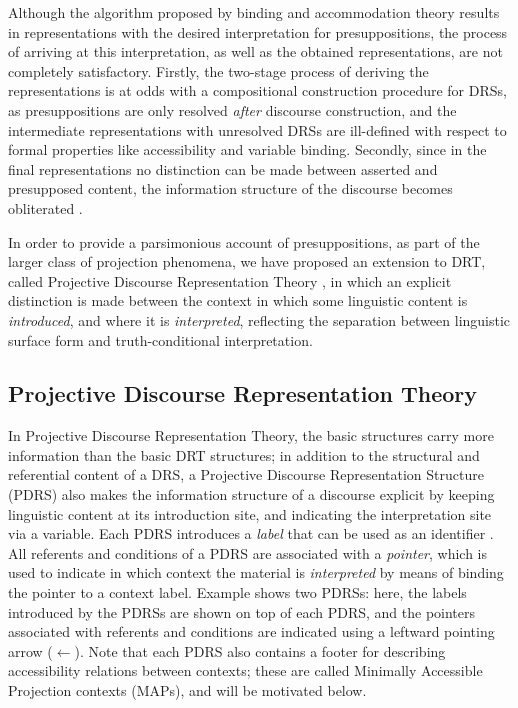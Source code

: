 \noindent Although the algorithm proposed by binding and accommodation
theory results in representations with the desired interpretation for
presuppositions, the process of arriving at this interpretation, as well as
the obtained representations, are not completely satisfactory. Firstly, the
two-stage process of deriving the representations is at odds with
a compositional construction procedure for DRSs, as presuppositions are only
resolved \textit{after} discourse construction, and the intermediate
representations with unresolved DRSs are ill-defined with respect to formal
properties like accessibility and variable binding. Secondly, since in the
final representations no distinction can be made between asserted and
presupposed content, the information structure of the discourse becomes
obliterated .


In order to provide a parsimonious account of presuppositions, as part of
the larger class of projection phenomena, we have proposed an extension to
DRT, called Projective Discourse Representation Theory
, in which an explicit distinction is
made between the context in which some linguistic content is
\textit{introduced}, and where it is \textit{interpreted}, reflecting the
separation between linguistic surface form and truth-conditional
interpretation.

\subsection{Projective Discourse Representation Theory}

In Projective Discourse Representation Theory, the basic structures carry
more information than the basic DRT structures; in addition to the
structural and referential content of a DRS, a Projective Discourse
Representation Structure (PDRS) also makes the information structure of
a discourse explicit by keeping linguistic content at its introduction site,
and indicating the interpretation site via a variable. 
Each PDRS introduces
a \textit{label} that can be used as an identifier
.  All referents and
conditions of a PDRS are associated with a \textit{pointer}, which is used
to indicate in which context the material is \textit{interpreted} by means
of binding the pointer to a context label.  Example \Next shows two PDRSs:
here, the labels introduced by the PDRSs are shown on top of each PDRS, and
the pointers associated with referents and conditions are indicated using
a leftward pointing arrow ($\gets$). Note that each PDRS also contains a footer for
describing accessibility relations between contexts; these are called
Minimally Accessible Projection contexts (MAPs), and will be motivated
below.


